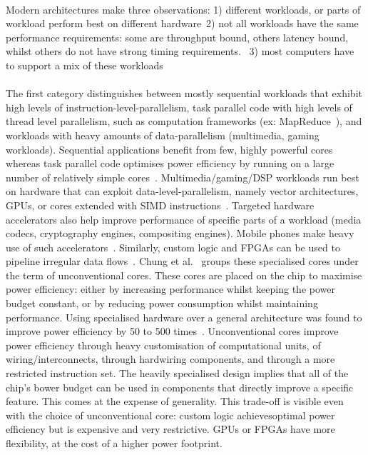 \paragraph{} Modern architectures make three observations: 1) different workloads,
or parts of workload perform best on different hardware~\cite{5695539}2) not all
workloads have the same performance requirements: some are throughput
bound, others latency bound, whilst others do not have strong timing requirements.~\cite{greenhalgh2011biglittle}
3) most computers have to support a mix of these workloads~\cite{Kumar:2004:SHM:998680.1006707}

\paragraph{} The first category distinguishes between mostly sequential workloads that exhibit high levels of instruction-level-parallelism, task parallel code with high levels of thread level parallelism, such as computation frameworks
(ex: MapReduce~\cite{dean2004mapreduce}), and workloads with heavy amounts of data-parallelism (multimedia, gaming workloads). Sequential applications benefit from few, highly powerful cores whereas task parallel code optimises power efficiency by running on a large number of relatively simple cores~\cite{Kumar:2005:HCM:1100859.1100890}. Multimedia/gaming/DSP workloads run best on hardware that can exploit data-level-parallelism, namely vector architectures, GPUs, or cores extended with SIMD instructions~\cite{Rossbach:2013:DCR:2517349.2522715}. Targeted hardware accelerators also help improve performance of specific parts of a workload (media codecs, cryptography engines, compositing engines)\cite{borkar2011future}. Mobile phones make 
heavy use of such accelerators~\cite{borkar2011future}. Similarly, custom logic and FPGAs can be used to pipeline irregular data flows~\cite{5695539}.
Chung et al.~\cite{5695539} groups these specialised cores under the term of unconventional cores. These cores are placed on the chip to maximise power efficiency: 
either by increasing performance whilst keeping the power budget constant,
or by reducing power consumption whilst maintaining performance. Using specialised hardware over a general architecture was found to improve power efficiency by 50 to 500 times~\cite{borkar2011future}.
Unconventional cores improve power efficiency through heavy customisation of computational units, of wiring/interconnects, through hardwiring components, and through a more restricted instruction set. The heavily specialised design implies that all of the chip's bower budget can be used in components that directly improve a specific feature. This comes at the expense of generality. This trade-off is visible even with the choice of unconventional core: custom logic achievesoptimal power efficiency but is expensive and very restrictive. GPUs or FPGAs have more flexibility, at the cost of a higher power footprint.  

